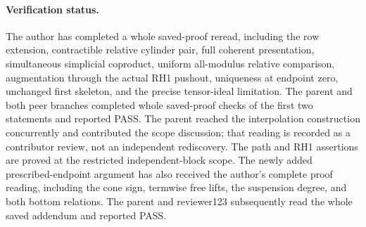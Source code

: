 \paragraph{Verification status.}
The author has completed a whole saved-proof reread, including
the row extension, contractible relative cylinder pair, full
coherent presentation, simultaneous simplicial coproduct,
uniform all-modulus relative comparison, augmentation through
the actual RH1 pushout, uniqueness at endpoint zero, unchanged
first skeleton, and the precise tensor-ideal limitation.
The parent and both peer branches completed whole saved-proof
checks of the first two statements and reported PASS.  The parent
reached the interpolation construction concurrently and contributed
the scope discussion; that reading is recorded as a contributor
review, not an independent rediscovery.  The path and RH1 assertions
are proved at the restricted independent-block scope.
The newly added prescribed-endpoint argument has also received
the author's complete proof reading, including the cone sign,
termwise free lifts, the suspension degree, and both bottom
relations.  The parent and reviewer123 subsequently read the whole saved
addendum and reported PASS.
